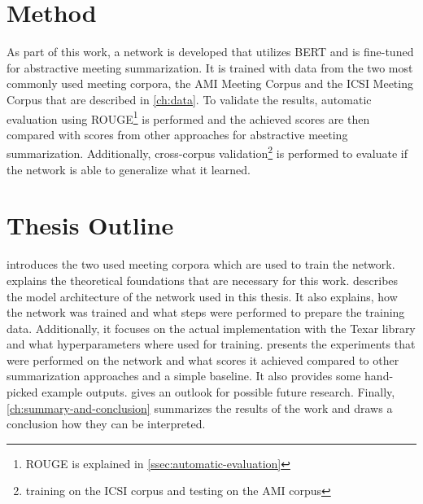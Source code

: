 
\section{Method}

As part of this work, a network is developed that utilizes BERT and is fine-tuned for abstractive meeting summarization.
It is trained with data from the two most commonly used meeting corpora, the AMI Meeting Corpus \cite{Mccowan05theami} and the ICSI Meeting Corpus \cite{Janin} that are described in \cref{ch:data}.
To validate the results, automatic evaluation using ROUGE\footnote{ROUGE is explained in \cref{ssec:automatic-evaluation}} is performed and the achieved scores are then compared with scores from other approaches for abstractive meeting summarization.
Additionally, cross-corpus validation\footnote{\Eg training on the ICSI corpus and testing on the AMI corpus} is performed to evaluate if the network is able to generalize what it learned.


\section{Thesis Outline}

 introduces the two used meeting corpora which are used to train the network.
 explains the theoretical foundations that are necessary for this work.
 describes the model architecture of the network used in this thesis.
It also explains, how the network was trained and what steps were performed to prepare the training data.
Additionally, it focuses on the actual implementation with the Texar library \cite{hu2019texar} and what hyperparameters where used for training.
 presents the experiments that were performed on the network and what scores it achieved compared to other summarization approaches and a simple baseline.
It also provides some hand-picked example outputs.
 gives an outlook for possible future research.
Finally, \cref{ch:summary-and-conclusion} summarizes the results of the work and draws a conclusion how they can be interpreted.
